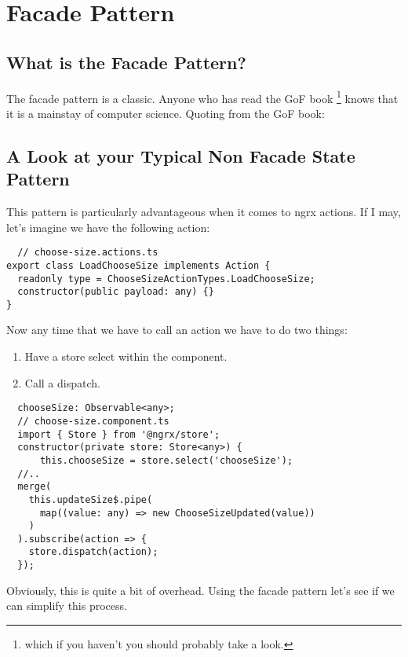 \maketitle{}
\section{ Facade Pattern }

\subsection{ What is the Facade Pattern? }
The facade pattern is a classic. Anyone who has read the GoF book \footnote{
which if you haven't you should probably take a look.} knows that it is a
mainstay of computer science. Quoting from the GoF book:


\subsection{ A Look at your Typical Non Facade State Pattern  }
This pattern is particularly advantageous when it comes to ngrx actions. If I
may, let's imagine we have the following action:

\begin{lstlisting}
  // choose-size.actions.ts
export class LoadChooseSize implements Action {
  readonly type = ChooseSizeActionTypes.LoadChooseSize;
  constructor(public payload: any) {}
}
\end{lstlisting}

Now any time that we have to call an action we have to do two things:
\begin{enumerate}
  \item Have a store select within the component.
  \item Call a dispatch.
\end{enumerate}

\begin{lstlisting}
  chooseSize: Observable<any>;
  // choose-size.component.ts
  import { Store } from '@ngrx/store';
  constructor(private store: Store<any>) {
      this.chooseSize = store.select('chooseSize');
  //..
  merge(
    this.updateSize$.pipe(
      map((value: any) => new ChooseSizeUpdated(value))
    )
  ).subscribe(action => {
    store.dispatch(action);
  });
\end{lstlisting}

Obviously, this is quite a bit of overhead. Using the facade pattern let's see
if we can simplify this process.
